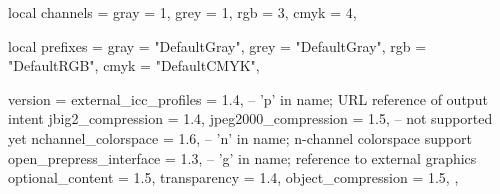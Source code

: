 %
%
%

local channels = {
    gray = 1,
    grey = 1,
    rgb  = 3,
    cmyk = 4,
}

local prefixes = {
    gray = "DefaultGray",
    grey = "DefaultGray",
    rgb  = "DefaultRGB",
    cmyk = "DefaultCMYK",
}

version = {
        external_icc_profiles   = 1.4, -- 'p' in name; URL reference of output intent
        jbig2_compression       = 1.4,
        jpeg2000_compression    = 1.5, -- not supported yet
        nchannel_colorspace     = 1.6, -- 'n' in name; n-channel colorspace support
        open_prepress_interface = 1.3, -- 'g' in name; reference to external graphics
        optional_content        = 1.5,
        transparency            = 1.4,
        object_compression      = 1.5,
    },

